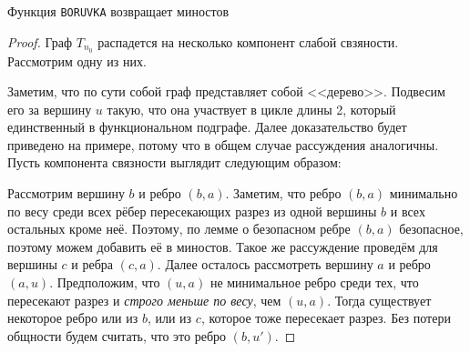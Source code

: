 \St Функция \texttt{BORUVKA} возвращает миностов
\begin{proof}

    Граф $T_{n_0}$ распадется на несколько компонент слабой свзяности. Рассмотрим одну из них.

    Заметим, что по сути собой граф представляет собой <<дерево>>. Подвесим его за вершину $u$ такую, что она участвует в цикле длины 2, который единственный в функциональном подграфе.
    Далее доказательство будет приведено на примере, потому что в общем случае рассуждения аналогичны. Пусть компонента связности выглядит следующим образом:

    \begin{figure}[H]
        \centering
    \end{figure}
    
    Рассмотрим вершину $b$ и ребро $(b, a)$. Заметим, что ребро $(b, a)$ минимально по весу среди всех рёбер пересекающих разрез из одной вершины $b$ и всех остальных кроме неё.
    Поэтому, по лемме о безопасном ребре $(b, a)$ безопасное, поэтому можем добавить её в миностов.
    Такое же рассуждение проведём для вершины $c$ и ребра $(c, a)$. Далее осталось рассмотреть вершину $a$ и ребро $(a, u)$.
    Предположим, что $(u, a)$ не минимальное ребро среди тех, что пересекают разрез и \textit{строго меньше по весу}, чем $(u, a)$. Тогда существует некоторое ребро или из $b$, или из $c$, которое тоже пересекает разрез. Без потери общности будем считать, что это ребро $(b, u')$.


\end{proof}
